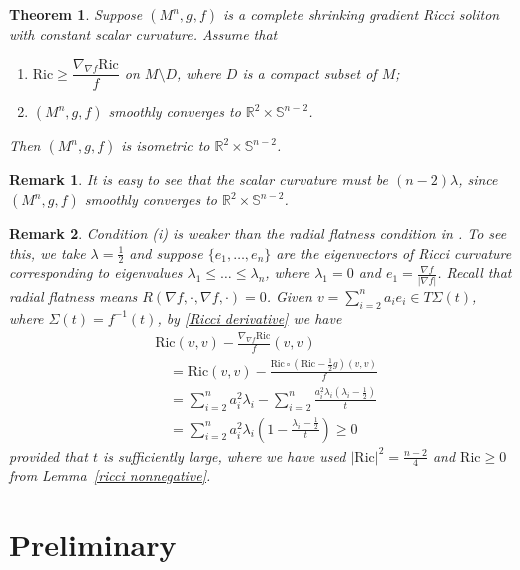 \documentclass[a4, 12pt]{amsart}
\theoremstyle{plain}
\newtheorem{theorem}{Theorem}[section]
\newtheorem{remark}{Remark}[section]
\newcommand{\Ric}{\mathrm{Ric}}
\begin{document}
\begin{theorem}\label{thm:main}
	Suppose $(M^n, g, f)$ is a complete shrinking gradient Ricci soliton with constant scalar curvature. Assume that
	\begin{enumerate}
		\item[(i)] $\Ric \geq \dfrac{\nabla_{\nabla f}\Ric}{f}$ on $M \setminus D$, where $D$ is a compact subset of $M$;
		\item[(ii)] $(M^n, g, f)$ smoothly converges to $\mathbb{R}^2 \times \mathbb{S}^{n-2}$.
	\end{enumerate}
	Then $(M^n, g, f)$ is isometric to $\mathbb{R}^2 \times \mathbb{S}^{n-2}$.
\end{theorem}

\begin{remark}
	It is easy to see that the scalar curvature must be $ (n-2)\lambda$, since $(M^n, g, f)$ smoothly converges to $\mathbb{R}^2 \times \mathbb{S}^{n-2}$.
\end{remark}

\begin{remark}
	Condition \textup{(i)} is weaker than the radial flatness condition in \cite{Petersen-Wylie2}. To see this, we take $\lambda=\frac{1}{2}$ and suppose $\{e_1, \dots, e_n\}$ are the eigenvectors of Ricci curvature corresponding to eigenvalues $\lambda_1 \leq \dots \leq \lambda_n$, where $\lambda_1 = 0$ and $e_1 = \frac{\nabla f}{|\nabla f|}$. Recall that radial flatness means $R(\nabla f, \cdot, \nabla f, \cdot) = 0$. Given $v = \sum_{i=2}^n a_i e_i \in T\Sigma(t)$, where $\Sigma(t) = f^{-1}(t)$, by \eqref{Ricci derivative} we have
	\begin{align*}
		&\Ric(v, v) - \frac{\nabla_{\nabla f}\Ric}{f}(v, v) \\
		&\quad = \Ric(v, v) - \frac{\Ric \circ (\Ric - \frac{1}{2}g)(v, v)}{f} \\
		&\quad = \sum_{i=2}^n a_i^2 \lambda_i - \sum_{i=2}^n \frac{a_i^2 \lambda_i(\lambda_i - \frac{1}{2})}{t} \\
		&\quad = \sum_{i=2}^n a_i^2 \lambda_i\left(1 - \frac{\lambda_i - \frac{1}{2}}{t}\right) \geq 0
	\end{align*}
	provided that $t$ is sufficiently large, where we have used $|\Ric|^2 = \frac{n-2}{4}$ and $\Ric \geq 0$ from Lemma~\ref{ricci nonnegative}.
\end{remark}






\section{Preliminary}
\end{document}
